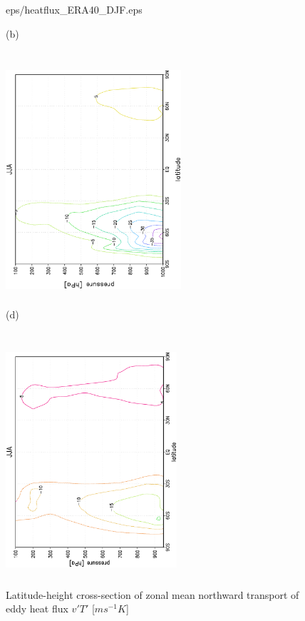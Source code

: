 \documentclass[12pt,a4paper,twoside,openright,headinclude,liststotoc,bibtotoc]{scrreprt}
\begin{document}
\begin{figure}[c]
{{eps/heatflux_ERA40_DJF.eps}
}
\parbox{8.5cm}{\hspace{1cm}\begin{scriptsize}(b)\end{scriptsize} \vspace{-0.5cm} \\
\includegraphics[height=8.5cm,width=6.5cm,angle=-90]
{eps/tmJJAheatflux.eps}
}
\parbox{8.5cm}{\hspace{0.90cm}\begin{scriptsize}(d)\end{scriptsize} \vspace{-0.55cm} \\
\includegraphics[height=8.5cm,width=6.35cm,angle=-90]
{eps/heatflux_ERA40_JJA.eps}
}
\caption[Eddy heat flux for DJF and JJA]{Latitude-height cross-section of zonal mean northward transport of eddy heat flux $v'T'$ [$ms^{-1}K$]}
\label{img:eddyheat}
\end{figure}
\end{document}
